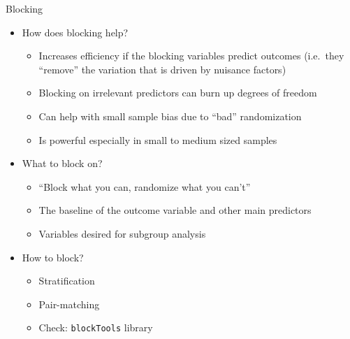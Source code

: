 \documentclass{beamer}
\numberwithin{equation}{section}
\begin{document}
\begin{frame}{Blocking}

\begin{itemize}
\itemsep1pt\parskip0pt
\item
  How does blocking help?

  \begin{itemize}
  \itemsep1pt\parskip0pt
  \item
    Increases efficiency if the blocking variables predict outcomes
    (i.e.~they ``remove'' the variation that is driven by nuisance factors)
  \item
    Blocking on irrelevant predictors can burn up degrees of freedom
  \item
    Can help with small sample bias due to ``bad'' randomization
  \item
    Is powerful especially in small to medium sized samples \pause
  \end{itemize}
\item
  What to block on?

  \begin{itemize}
  \itemsep1pt\parskip0pt
  \item
    ``Block what you can, randomize what you can't''
  \item
    The baseline of the outcome variable and other main predictors
  \item
    Variables desired for subgroup analysis
  \end{itemize}
\item
  How to block?

  \begin{itemize}
  \itemsep1pt\parskip0pt
  \item
    Stratification
  \item
    Pair-matching
  \item
    Check: \texttt{blockTools} library
  \end{itemize}
\end{itemize}

\end{frame}
\end{document}
